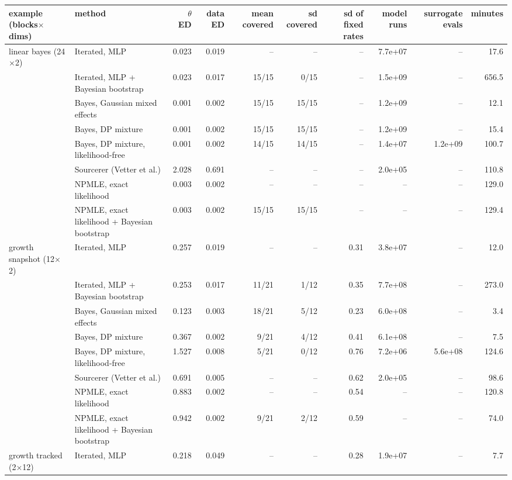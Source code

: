 \begin{tabular}{llrrrrrrrr}
\toprule
example (blocks$\times$dims) & method & $\theta$ ED & data ED & mean covered & sd covered & sd of fixed rates & model runs & surrogate evals & minutes \\
\midrule
linear bayes (24$\times$2) & Iterated, MLP & 0.023 & 0.019 & -- & -- & -- & 7.7e+07 & -- & 17.6 \\
 & Iterated, MLP + Bayesian bootstrap & 0.023 & 0.017 & 15/15 & 0/15 & -- & 1.5e+09 & -- & 656.5 \\
 & Bayes, Gaussian mixed effects & 0.001 & 0.002 & 15/15 & 15/15 & -- & 1.2e+09 & -- & 12.1 \\
 & Bayes, DP mixture & 0.001 & 0.002 & 15/15 & 15/15 & -- & 1.2e+09 & -- & 15.4 \\
 & Bayes, DP mixture, likelihood-free & 0.001 & 0.002 & 14/15 & 14/15 & -- & 1.4e+07 & 1.2e+09 & 100.7 \\
 & Sourcerer (Vetter et al.) & 2.028 & 0.691 & -- & -- & -- & 2.0e+05 & -- & 110.8 \\
 & NPMLE, exact likelihood & 0.003 & 0.002 & -- & -- & -- & -- & -- & 129.0 \\
 & NPMLE, exact likelihood + Bayesian bootstrap & 0.003 & 0.002 & 15/15 & 15/15 & -- & -- & -- & 129.4 \\ \addlinespace
growth snapshot (12$\times$2) & Iterated, MLP & 0.257 & 0.019 & -- & -- & 0.31 & 3.8e+07 & -- & 12.0 \\
 & Iterated, MLP + Bayesian bootstrap & 0.253 & 0.017 & 11/21 & 1/12 & 0.35 & 7.7e+08 & -- & 273.0 \\
 & Bayes, Gaussian mixed effects & 0.123 & 0.003 & 18/21 & 5/12 & 0.23 & 6.0e+08 & -- & 3.4 \\
 & Bayes, DP mixture & 0.367 & 0.002 & 9/21 & 4/12 & 0.41 & 6.1e+08 & -- & 7.5 \\
 & Bayes, DP mixture, likelihood-free & 1.527 & 0.008 & 5/21 & 0/12 & 0.76 & 7.2e+06 & 5.6e+08 & 124.6 \\
 & Sourcerer (Vetter et al.) & 0.691 & 0.005 & -- & -- & 0.62 & 2.0e+05 & -- & 98.6 \\
 & NPMLE, exact likelihood & 0.883 & 0.002 & -- & -- & 0.54 & -- & -- & 120.8 \\
 & NPMLE, exact likelihood + Bayesian bootstrap & 0.942 & 0.002 & 9/21 & 2/12 & 0.59 & -- & -- & 74.0 \\ \addlinespace
growth tracked (2$\times$12) & Iterated, MLP & 0.218 & 0.049 & -- & -- & 0.28 & 1.9e+07 & -- & 7.7 \\

\end{tabular}

